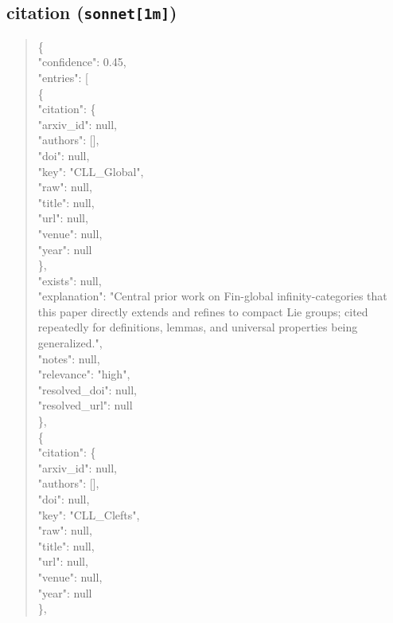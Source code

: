 \documentclass[11pt]{article}
\begin{document}
\subsection*{citation (\texttt{sonnet[1m]})}
\begin{quote}\small\ttfamily\raggedright
\{\\
  "confidence": 0.45,\\
  "entries": [\\
    \{\\
      "citation": \{\\
        "arxiv\_id": null,\\
        "authors": [],\\
        "doi": null,\\
        "key": "CLL\_Global",\\
        "raw": null,\\
        "title": null,\\
        "url": null,\\
        "venue": null,\\
        "year": null\\
      \},\\
      "exists": null,\\
      "explanation": "Central prior work on Fin-global infinity-categories that this paper directly extends and refines to compact Lie groups; cited repeatedly for definitions, lemmas, and universal properties being generalized.",\\
      "notes": null,\\
      "relevance": "high",\\
      "resolved\_doi": null,\\
      "resolved\_url": null\\
    \},\\
    \{\\
      "citation": \{\\
        "arxiv\_id": null,\\
        "authors": [],\\
        "doi": null,\\
        "key": "CLL\_Clefts",\\
        "raw": null,\\
        "title": null,\\
        "url": null,\\
        "venue": null,\\
        "year": null\\
      \},\\

\end{quote}
\end{document}
